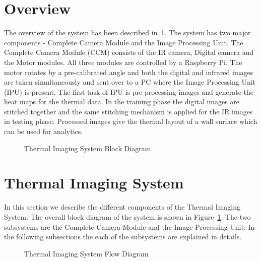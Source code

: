 \documentclass{sig-alternate}
\begin{document}
\section{Overview}

\indent The overview of the system has been described in~\ref{fig:Overview}. The system has two major components - Complete Camera Module and the Image Processing Unit. The Complete Camera Module (CCM) consists of the IR camera, Digital camera and the Motor modules. All three modules are controlled by a Raspberry Pi. The motor rotates by a pre-calibrated angle and both the digital and infrared images are taken simultaneously and sent over to a PC where the Image Processing Unit (IPU) is present. The first task of IPU is pre-processing images and generate the heat maps for the thermal data. In the training phase the digital images are stitched together and the same stitching mechanism is applied for the IR images in testing phase. Processed images give the thermal layout of a wall surface which can be used for analytics. 

\begin{figure}[!h] 
\begin{center}
\vspace{-.1in}
 \caption{Thermal Imaging System Block Diagram}
 \label{fig:Overview}
\end{center}
\end{figure}

\section{Thermal Imaging System}

	In this section we describe the different components of the Thermal Imaging System. The overall block diagram of the system is shown in Figure~\ref{fig:Overview}. The two subsystems are the Complete Camera Module and the Image Processing Unit. In the following subsections the each of the subsystems are explained in details.
	\begin{figure}[!htb]
\begin{center}
 \caption{Thermal Imaging System Flow Diagram}
 \label{fig:Flow}
\end{center}
\end{figure}
	
	
\end{document}
